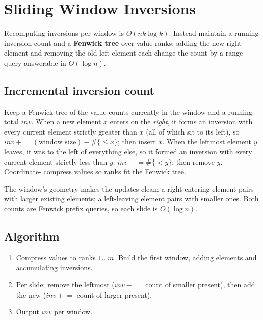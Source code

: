 \section{Sliding Window Inversions}
\label{sec:cses-sw-inversions}


\begin{patternbox}
Recomputing inversions per window is $O(nk\log k)$. Instead maintain a
running inversion count and a \textbf{Fenwick tree} over value ranks:
adding the new right element and removing the old left element each change
the count by a range query answerable in $O(\log n)$.
\end{patternbox}

\subsection*{Incremental inversion count}

Keep a Fenwick tree of the value counts currently in the window and a
running total $\textit{inv}$. When a new element $x$ enters on the
\emph{right}, it forms an inversion with every current element strictly
greater than $x$ (all of which sit to its left), so
$\textit{inv}\mathrel{+}=(\text{window size})-\#\{\le x\}$; then insert
$x$. When the leftmost element $y$ leaves, it was to the left of everything
else, so it formed an inversion with every current element strictly less
than $y$: $\textit{inv}\mathrel{-}=\#\{<y\}$; then remove $y$. Coordinate-
compress values so ranks fit the Fenwick tree.

\begin{ideabox}
The window's geometry makes the updates clean: a right-entering element
pairs with larger existing elements; a left-leaving element pairs with
smaller ones. Both counts are Fenwick prefix queries, so each slide is
$O(\log n)$.
\end{ideabox}

\subsection*{Algorithm}

\begin{enumerate}
  \item Compress values to ranks $1\ldots m$. Build the first window,
        adding elements and accumulating inversions.
  \item Per slide: remove the leftmost ($\textit{inv}\mathrel{-}=$ count
        of smaller present), then add the new ($\textit{inv}
        \mathrel{+}=$ count of larger present).
  \item Output $\textit{inv}$ per window.
\end{enumerate}

